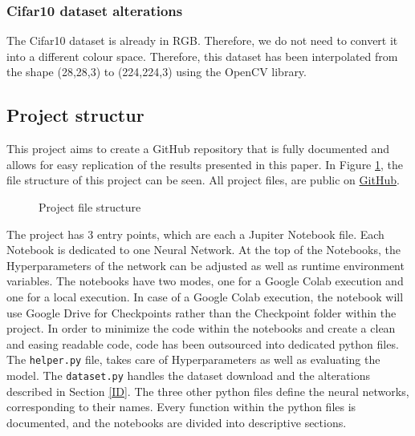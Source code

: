\documentclass[conference]{IEEEtran}
\begin{document}
\subsubsection{Cifar10 dataset alterations}
The Cifar10 dataset is already in RGB. Therefore, we do not need to convert it into a different colour space. 
Therefore, this dataset has been interpolated from the shape (28,28,3) to (224,224,3) using the OpenCV library.

\subsection{Project structur}
This project aims to create a GitHub repository that is fully documented and allows for easy replication of the results presented in this paper. 
In Figure \ref{dir: file strucutre}, the file structure of this project can be seen.
All project files, are public on \href{https://github.com/devasworski/Deeper-Networks-for-Image-Classification}{GitHub}.
\begin{figure}[!htbp]
\caption{Project file structure}
\label{dir: file strucutre}
\end{figure}

The project has 3 entry points, which are each a Jupiter Notebook file. Each Notebook is dedicated to one Neural Network.
At the top of the Notebooks, the Hyperparameters of the network can be adjusted as well as runtime environment variables.
The notebooks have two modes, one for a Google Colab execution and one for a local execution.
In case of a Google Colab execution, the notebook will use Google Drive for Checkpoints rather than the Checkpoint folder within the project.
In order to minimize the code within the notebooks and create a clean and easing readable code, code has been outsourced into dedicated python files.
The \verb|helper.py| file, takes care of Hyperparameters as well as evaluating the model. The \verb|dataset.py| handles the dataset download and the alterations described in Section \ref{ID}.
The three other python files define the neural networks, corresponding to their names. Every function within the python files is documented, and the notebooks are divided into descriptive sections.
\end{document}
